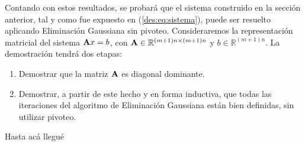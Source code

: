         Contando con estos resultados, se probará que el sistema construido en la sección anterior, tal y como fue expuesto en (\ref{des:eq:sistema}), puede ser resuelto aplicando Eliminación Gaussiana sin pivoteo. Consideraremos la representación matricial del sistema $\mathbf{A}x=b$, con $\mathbf{A} \in \mathbb{R}^{(m+1)n \times (m+1)n}$ y $b \in \mathbb{R}^{(m+1)n}$. La demostración tendrá dos etapas:
        \begin{enumerate}[label=(\arabic*), nosep]
            \item Demostrar que la matriz $\mathbf{A}$ es diagonal dominante.
            \item Demostrar, a partir de este hecho y en forma inductiva, que todas las iteraciones del algoritmo de Eliminación Gaussiana están bien definidas, sin utilizar pivoteo.
        \end{enumerate}

        {\color{red}
            Hasta acá llegué
        }




